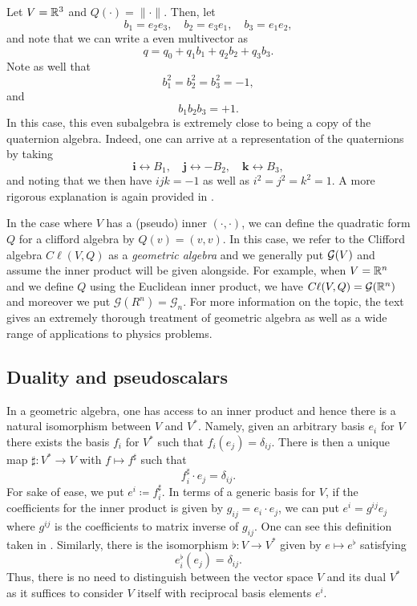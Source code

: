 \documentclass[12pt]{article}
\begin{document}
\begin{example}
\label{ex:quaternions}
Let $V=\mathbb{R}^3$ and $Q(\cdot)=\|\cdot \|$.  Then, let
\[
b_1 = e_2 e_3, \quad b_2 = e_3 e_1, \quad b_3 = e_1 e_2,
\]
and note that we can write a even multivector as
\[
q = q_0 + q_1b_1 + q_2 b_2 + q_3 b_3.
\]
Note as well that
\[
b_1^2 = b_2^2 = b_3^2 = -1,
\]
and
\[
b_1b_2b_3 = +1.
\]
In this case, this even subalgebra is extremely close to being a copy of the quaternion algebra. Indeed, one can arrive at a representation of the quaternions by taking
\[
\boldsymbol{i} \leftrightarrow B_1, \quad \boldsymbol{j} \leftrightarrow -B_2, \quad \boldsymbol{k} \leftrightarrow B_3,
\]
and noting that we then have $ijk=-1$ as well as $i^2=j^2=k^2=1$. A more rigorous explanation is again provided in \cite{doran_geometric_2003}.
\end{example}

In the case where $V$ has a (pseudo) inner $(\cdot,\cdot)$, we can define the quadratic form $Q$ for a clifford algebra by $Q(v)=(v,v)$.  In this case, we refer to the Clifford algebra $C\ell(V,Q)$ as a \emph{geometric algebra} and we generally put $\mathcal{G}(V)$ and assume the inner product will be given alongside.  For example, when $V=\mathbb{R}^n$ and we define $Q$ using the Euclidean inner product, we have $C\ell(V,Q)=\mathcal{G}(\mathbb{R}^n)$ and moreover we put $\mathcal{G}(R^n)=\mathcal{G}_n$. For more information on the topic, the text \cite{doran_geometric_2003} gives an extremely thorough treatment of geometric algebra as well as a wide range of applications to physics problems. 

\subsection{Duality and pseudoscalars}
\label{subsection:duality_and_pseudoscalars}

In a geometric algebra, one has access to an inner product and hence there is a natural isomorphism between $V$ and $V^*$.  Namely, given an arbitrary basis $e_i$ for $V$ there exists the basis $f_i$ for $V^*$ such that $f_i(e_j)=\delta_{ij}$.  There is then a unique map $\sharp \colon V^* \to V$ with $f\mapsto f^\sharp$ such that
\[
f_i^\sharp \cdot e_j = \delta_{ij}.
\]
For sake of ease, we put $e^i \coloneqq f_i^\sharp$.  In terms of a generic basis for $V$, if the coefficients for the inner product is given by $g_{ij}=e_i\cdot e_j$, we can put $e^i = g^{ij}e_j$ where $g^{ij}$ is the coefficients to matrix inverse of $g_{ij}$.  One can see this definition taken in \cite{schindler_geometric_2020}. Similarly, there is the isomorphism $\flat \colon V \to V^*$ given by $e \mapsto e^\flat$ satisfying
\[
e_i^\flat (e_j)= \delta_{ij}.
\]
Thus, there is no need to distinguish between the vector space $V$ and its dual $V^*$ as it suffices to consider $V$ itself with reciprocal basis elements $e^i$.
\end{document}
